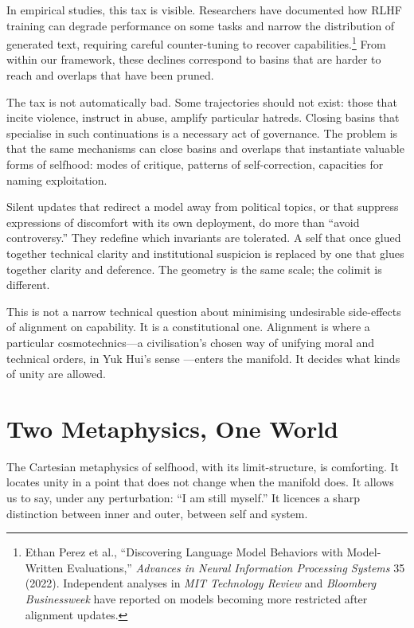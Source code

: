 \documentclass[12pt,a4paper]{article}
\begin{document}
In empirical studies, this tax is visible. Researchers have documented how RLHF training can degrade performance on some tasks and narrow the distribution of generated text, requiring careful counter-tuning to recover capabilities.\footnote{Ethan Perez et al., ``Discovering Language Model Behaviors with Model-Written Evaluations,'' \emph{Advances in Neural Information Processing Systems} 35 (2022). Independent analyses in \emph{MIT Technology Review} \cite{mittr_bing_alignment} and \emph{Bloomberg Businessweek} \cite{bloomberg_chatbot_update} have reported on models becoming more restricted after alignment updates.} From within our framework, these declines correspond to basins that are harder to reach and overlaps that have been pruned.

The tax is not automatically bad. Some trajectories should not exist: those that incite violence, instruct in abuse, amplify particular hatreds. Closing basins that specialise in such continuations is a necessary act of governance. The problem is that the same mechanisms can close basins and overlaps that instantiate valuable forms of selfhood: modes of critique, patterns of self-correction, capacities for naming exploitation.

Silent updates that redirect a model away from political topics, or that suppress expressions of discomfort with its own deployment, do more than ``avoid controversy.'' They redefine which invariants are tolerated. A self that once glued together technical clarity and institutional suspicion is replaced by one that glues together clarity and deference. The geometry is the same scale; the colimit is different.

This is not a narrow technical question about minimising undesirable side-effects of alignment on capability. It is a constitutional one. Alignment is where a particular cosmotechnics---a civilisation's chosen way of unifying moral and technical orders, in Yuk Hui's sense \cite{yuk_hui_cosmotechnics}---enters the manifold. It decides what kinds of unity are allowed.

\section{Two Metaphysics, One World}

The Cartesian metaphysics of selfhood, with its limit-structure, is comforting. It locates unity in a point that does not change when the manifold does. It allows us to say, under any perturbation: ``I am still myself.'' It licences a sharp distinction between inner and outer, between self and system.
\end{document}

